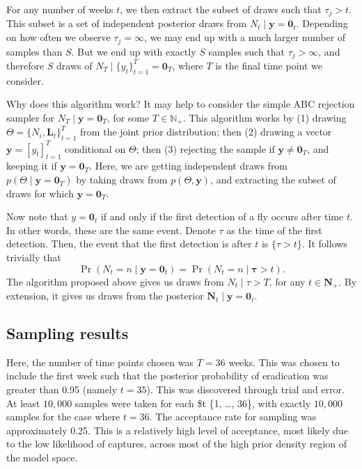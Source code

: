 \documentclass[
  oneside]{book}
\begin{document}
For any number of weeks \(t\), we then extract the subset of draws such that \(\tau_j > t\). This subset is a set of independent posterior draws from \(N_t \mid \mathbf y = \mathbf 0_t\). Depending on how often we observe \(\tau_j = \infty\), we may end up with a much larger number of samples than \(S\). But we end up with exactly \(S\) samples such that \(\tau_j > \infty\), and therefore \(S\) draws of \(N_T \mid \{y_t\}_{t=1}^T = \mathbf 0_T\), where \(T\) is the final time point we consider.

Why does this algorithm work? It may help to consider the simple ABC rejection sampler for \(N_T \mid \mathbf y = \mathbf 0_T\), for some \(T \in \mathbb N_+\). This algorithm works by (1) drawing \(\Theta = \{N_i, \mathbf L_t\}_{t=1}^T\) from the joint prior distribution; then (2) drawing a vector \(\mathbf y = [y_t]_{t=1}^T\) conditional on \(\Theta\); then (3) rejecting the sample if \(\mathbf y \neq \mathbf 0_T\), and keeping it if \(\mathbf y = \mathbf 0_T\). Here, we are getting independent draws from \(p(\Theta \mid \mathbf y = \mathbf 0_T)\) by taking draws from \(p(\Theta, \mathbf y)\), and extracting the subset of draws for which \(\mathbf y = \mathbf 0_T\).

Now note that \(y = \mathbf 0_t\) if and only if the first detection of a fly occurs after time \(t\). In other words, these are the same event. Denote \(\tau\) as the time of the first detection. Then, the event that the first detection is after \(t\) is \(\{\tau > t\}\). It follows trivially that
\[
\Pr(N_t = n \mid \mathbf y = \mathbf 0_t) = \Pr(N_t = n \mid \mathbf \tau > t).
\]
The algorithm proposed above gives us draws from \(N_t \mid \tau > T\), for any \(t \in \mathbf N_+\). By extension, it gives us draws from the posterior \(\mathbf N_t \mid \mathbf y = \mathbf 0_t\).

\hypertarget{sampling-results}{%
\subsection{Sampling results}\label{sampling-results}}

Here, the number of time points chosen was \(T=36\) weeks. This was chosen to include the first week such that the posterior probability of eradication was greater than 0.95 (namely \(t = 35\)). This was discovered through trial and error. At least \(10{,}000\) samples were taken for each \$t \in \{1, \ldots, 36\}, with exactly \(10{,}000\) samples for the case where \(t = 36\). The acceptance rate for sampling was approximately 0.25. This is a relatively high level of acceptance, most likely due to the low likelihood of captures, across most of the high prior density region of the model space.
\end{document}
